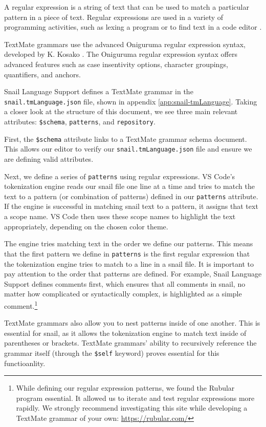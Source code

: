 \documentclass{article}
\begin{document}
A regular expression is a string of text that can be used to match a particular pattern in a piece of text. Regular expressions are used in a variety of programming activities, such as lexing a program or to find text in a code editor \cite{ComputerHope_2022, Cornell_2022}. 

TextMate grammars use the advanced Oniguruma regular expression syntax, developed by K. Kosako \cite{Microsoft_2023h, MacroMates_2021b}. The Oniguruma regular expression syntax offers advanced features such as case insentivity options, character groupings, quantifiers, and anchors. 

Snail Language Support defines a TextMate grammar in the \lstinline{snail.tmLanguage.json} file, shown in appendix \ref{app:snail-tmLanguage}. Taking a closer look at the structure of this document, we see three main relevant attributes: \lstinline{$schema}, \lstinline{patterns}, and \lstinline{repository}. 

First, the \lstinline{$schema} attribute links to a TextMate grammar schema document. This allows our editor to verify our \lstinline{snail.tmLanguage.json} file and ensure we are defining valid attributes.

Next, we define a series of \lstinline{patterns} using regular expressions.  VS Code's tokenization engine reads our snail file one line at a time and tries to match the text to a pattern (or combination of patterns) defined in our \lstinline{patterns} attribute. If the engine is successful in matching snail text to a pattern, it assigns that text a scope name. VS Code then uses these scope names to highlight the text appropriately, depending on the chosen color theme. 

The engine tries matching text in the order we define our patterns. This means that the first pattern we define in \lstinline{patterns} is the first regular expression that the tokenization engine tries to match to a line in a snail file. It is important to pay attention to the order that patterns are defined. For example, Snail Language Support defines comments first, which ensures that all comments in snail, no matter how complicated or syntactically complex, is highlighted as a simple comment.\footnote{While defining our regular expression patterns, we found the Rubular program essential. It allowed us to iterate and test regular expressions more rapidly. We strongly recommend investigating this site while developing a TextMate grammar of your own: \url{https://rubular.com/}} 

TextMate grammars also allow you to nest patterns inside of one another. This is essential for snail, as it allows the tokenization engine to match text inside of parentheses or brackets. TextMate grammars' ability to recursively reference the grammar itself (through the \lstinline{$self} keyword) proves essential for this functioanlity. 
\end{document}
